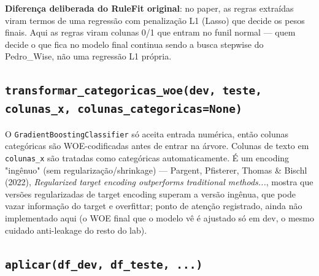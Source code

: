 \documentclass[11pt]{article}
\begin{document}
\textbf{Diferença deliberada do RuleFit original}: no paper, as regras
extraídas viram termos de uma regressão com penalização L1 (Lasso) que
decide os pesos finais. Aqui as regras viram colunas 0/1 que entram no funil
normal --- quem decide o que fica no modelo final continua sendo a busca
stepwise do Pedro\_Wise, não uma regressão L1 própria.

\subsection*{\texttt{transformar\_categoricas\_woe(dev, teste, colunas\_x, colunas\_categoricas=None)}}

O \texttt{GradientBoostingClassifier} só aceita entrada numérica, então
colunas categóricas são WOE-codificadas antes de entrar na árvore. Colunas
de texto em \texttt{colunas\_x} são tratadas como categóricas
automaticamente. É um encoding "ingênuo" (sem regularização/shrinkage) ---
Pargent, Pfisterer, Thomas \& Bischl (2022), \emph{Regularized target
encoding outperforms traditional methods...}, mostra que versões
regularizadas de target encoding superam a versão ingênua, que pode vazar
informação do target e overfittar; ponto de atenção registrado, ainda não
implementado aqui (o WOE final que o modelo vê é ajustado só em dev, o
mesmo cuidado anti-leakage do resto do lab).

\subsection*{\texttt{aplicar(df\_dev, df\_teste, ...)}}
\end{document}
